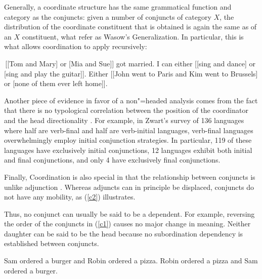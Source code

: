 \documentclass[output=paper
                ,modfonts
                ,nonflat
	        ,collection
	        ,collectionchapter
	        ,collectiontoclongg
 	        ,biblatex
                ,babelshorthands
                ,newtxmath
                ,draftmode
                ,colorlinks, citecolor=brown
]{./langsci/langscibook}
\begin{document}
Generally, a coordinate structure has the same grammatical function and category as the conjuncts: given a number of conjuncts of category $X$, the distribution of the coordinate constituent that is obtained is again the same as of an $X$ constituent, what \citet{pullumzwicky} refer as Wasow's Generalization.
In particular, this is what allows coordination to apply recursively:

\begin{exe}
\ex
\begin{xlista}
\ex \,[[Tom and Mary] or [Mia and Sue]] got married.
\ex I can either [[sing and dance] or [sing and play the guitar]].
\ex Either [[John went to Paris and Kim went to Brussels] or
[none of them ever left home]].
\end{xlista}
\end{exe}

Another piece of evidence in favor of a non"=headed analysis comes from the fact that there is no typological correlation between the position of the coordinator and the head directionality \citep{zwart}. For example, in Zwart's  survey of 136 languages where half are verb-final and half
are verb-initial languages,  verb-final languages overwhelmingly employ initial conjunction strategies.
In particular, 119 of these languages have exclusively initial conjunctions, 12 languages exhibit both initial
and final conjunctions, and only 4 have exclusively final conjunctions. 


Finally, Coordination is also special in that the relationship between conjuncts is unlike adjunction \citep{levinepostal}.
Whereas adjuncts can in principle be displaced, conjuncts do not have any mobility, as (\ref{c2}) illustrates.

\begin{exe}
\ex
\begin{xlista}
\end{xlista}\label{c2}
\end{exe}


\noindent
Thus, no conjunct can usually be said to be a dependent. For example,  reversing the order of the conjuncts in (\ref{c1}) causes no major change in meaning. Neither daughter can be said to be the head because no subordination dependency is established between conjuncts.

\begin{exe}
\ex
\begin{xlista}
\ex Sam ordered a burger and Robin ordered a pizza.
\ex Robin ordered a pizza and Sam ordered a burger.
\end{xlista}\label{c1}
\end{exe}
\end{document}
